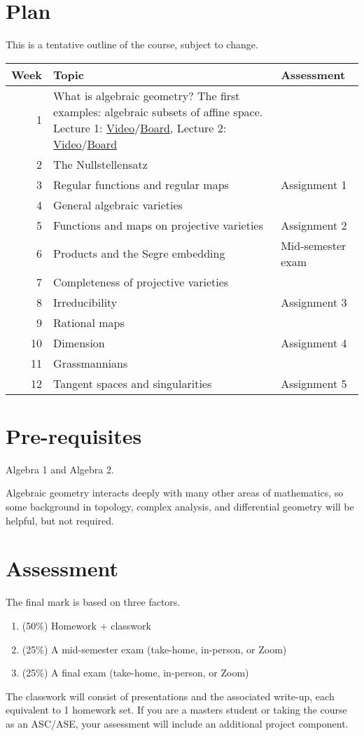 \documentclass[11pt]{article}
\begin{document}
\section{Plan}
\label{sec:orga98c37d}
This is a tentative outline of the course, subject to change.
\begin{center}
\begin{tabular}{rll}
\hline
Week & Topic & Assessment\\
\hline
1 & What is algebraic geometry? The first examples: algebraic subsets of affine space. Lecture 1: \href{https://cloudstor.aarnet.edu.au/plus/s/OMzlfgbXFWjlpSs}{Video}/\href{notes/2021-07-27.pdf}{Board}, Lecture 2: \href{https://cloudstor.aarnet.edu.au/plus/s/0kfXogCfxg4bQ3S}{Video}/\href{notes/2021-07-08.pdf}{Board} & \\
2 & The Nullstellensatz & \\
3 & Regular functions and regular maps & Assignment 1\\
4 & General algebraic varieties & \\
5 & Functions and maps on projective varieties & Assignment 2\\
6 & Products and the Segre embedding & Mid-semester exam\\
7 & Completeness of projective varieties & \\
8 & Irreducibility & Assignment 3\\
9 & Rational maps & \\
10 & Dimension & Assignment 4\\
11 & Grassmannians & \\
12 & Tangent spaces and singularities & Assignment 5\\
\hline
\end{tabular}
\end{center}


\section{Pre-requisites}
\label{sec:org5ddb516}
Algebra 1 and Algebra 2.

Algebraic geometry interacts deeply with many other areas of mathematics, so some background in topology, complex analysis, and differential geometry will be helpful, but not required. 

\section{Assessment}
\label{sec:org6242a28}
The final mark is based on three factors.
\begin{enumerate}
\item (50\%) Homework + classwork
\item (25\%) A mid-semester exam (take-home, in-person, or Zoom)
\item (25\%) A final exam (take-home, in-person, or Zoom)
\end{enumerate}
The classwork will consist of presentations and the associated write-up, each equivalent to 1 homework set.
If you are a masters student or taking the course as an ASC/ASE, your assessment will include an additional project component.
\end{document}

